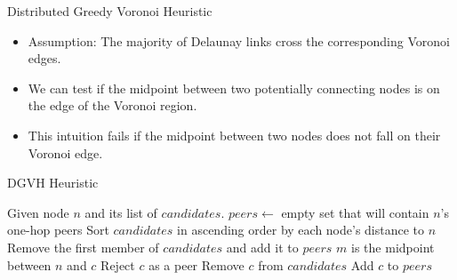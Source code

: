 \documentclass[11pt]{beamer}
\begin{document}

\begin{frame}{Distributed Greedy Voronoi Heuristic}
	
	\begin{itemize}
		\item Assumption: The majority of Delaunay links cross the corresponding Voronoi edges.
		\item We can test if the midpoint between two potentially connecting nodes is on the edge of the Voronoi region.
		\item This intuition fails if the midpoint between two nodes does not fall on their Voronoi edge.
	\end{itemize}
	
\end{frame}

\begin{frame}{DGVH Heuristic}
	
	\begin{algorithmic}[1]  %
		\STATE Given node $n$ and its list of $candidates$.
		\STATE $peers \leftarrow$ empty set that will contain $n$'s one-hop peers
		\STATE Sort $candidates$ in ascending order by each node's distance to $n$
		\STATE Remove the first member of $candidates$ and add it to $peers$
		\STATE $m$ is the midpoint between $n$ and $c$
		\STATE Reject $c$ as a peer
		\ELSE
		\STATE Remove $c$ from $candidates$
		\STATE Add $c$ to $peers$
		\ENDIF
		\ENDFOR
	\end{algorithmic}
	
\end{frame}
\end{document}
